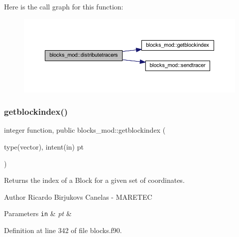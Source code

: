 Here is the call graph for this function\+:\nopagebreak
\begin{figure}[H]
\begin{center}
\leavevmode
\includegraphics[width=350pt]{namespaceblocks__mod_aa178415bcc40cf169744d356e1a09c6b_cgraph}
\end{center}
\end{figure}
\mbox{\label{namespaceblocks__mod_a62e8fb0d6b2535b4499c7a4d848c24ba}} 
\subsubsection{\texorpdfstring{getblockindex()}{getblockindex()}}
{\footnotesize\ttfamily integer function, public blocks\+\_\+mod\+::getblockindex (\begin{DoxyParamCaption}\item[{type(vector), intent(in)}]{pt }\end{DoxyParamCaption})}



Returns the index of a Block for a given set of coordinates. 

\begin{DoxyAuthor}{Author}
Ricardo Birjukovs Canelas -\/ M\+A\+R\+E\+T\+EC 
\end{DoxyAuthor}

\begin{DoxyParams}[1]{Parameters}
\mbox{\tt in}  & {\em pt} & \\
\hline
\end{DoxyParams}


Definition at line 342 of file blocks.\+f90.


